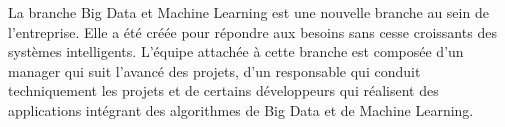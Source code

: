 La branche Big Data et Machine Learning est une nouvelle branche au sein de l’entreprise. Elle a été créée pour répondre aux besoins sans cesse croissants des systèmes intelligents. L’équipe attachée à cette branche est composée d’un manager qui suit l’avancé des projets, d’un responsable qui conduit techniquement les projets et de certains développeurs qui réalisent des applications intégrant des algorithmes de Big Data et de Machine Learning.